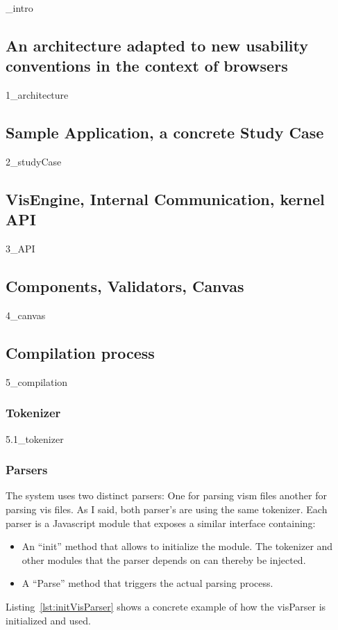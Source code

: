 {_intro}

\subsection{An architecture adapted to new usability conventions in the context of browsers}
\label{sec:indirection}
{1_architecture}

\subsection{Sample Application, a concrete Study Case}
\label{sec:studyCase}
{2_studyCase}

\subsection{VisEngine, Internal Communication, kernel API}
\label{sec:API}
{3_API}

\subsection{Components, Validators, Canvas}
\label{sec:canvas}
{4_canvas}

\subsection{Compilation process}
\label{sec:compilation}
{5_compilation}

\subsubsection{Tokenizer}
\label{sec:tokenizer}
{5.1_tokenizer}

\subsubsection{Parsers}
\label{sec:parsers}

The system uses two distinct parsers: One for parsing vism files another for parsing vis files. As I said, both parser's are using the same tokenizer. Each parser is a Javascript module that exposes a similar interface containing:
\begin{itemize}
    \item An ``init'' method that allows to initialize the module. The tokenizer and other modules that the parser depends on can thereby be injected.
    \item A ``Parse'' method that triggers the actual parsing process.
\end{itemize}
Listing~\ref{lst:initVisParser} shows a concrete example of how the visParser is initialized and used. 

